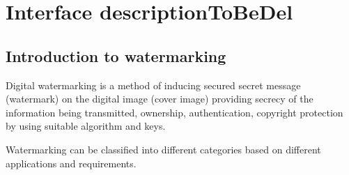 \chapter{Interface descriptionToBeDel}
\label{Chapter4}
\section{Introduction to watermarking}
Digital watermarking is a method of inducing secured secret message (watermark) on the digital image (cover image) providing secrecy of the information being transmitted, ownership, authentication, copyright protection \cite{P15} by using suitable algorithm and keys. 

Watermarking can be classified into different categories based on different applications and requirements.

